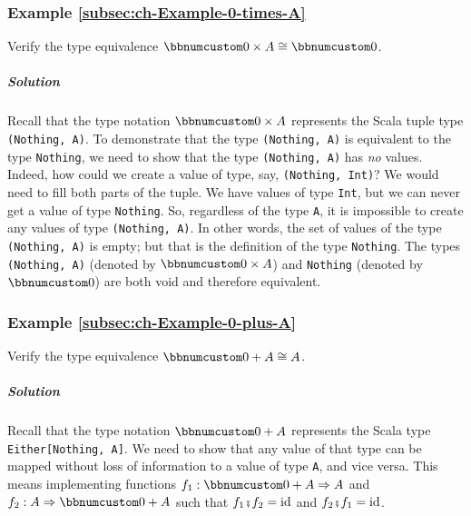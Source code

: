 \subsubsection{Example \label{subsec:ch-Example-0-times-A}\ref{subsec:ch-Example-0-times-A}}

Verify the type equivalence $\bbnum 0\times A\cong\bbnum 0$.

\subparagraph{Solution}

Recall that the type notation $\bbnum 0\times A$ represents the Scala
tuple type \lstinline!(Nothing, A)!. To demonstrate that the type
\lstinline!(Nothing, A)! is equivalent to the type \lstinline!Nothing!,
we need to show that the type \lstinline!(Nothing, A)! has \emph{no}
values. Indeed, how could we create a value of type, say, \lstinline!(Nothing, Int)!?
We would need to fill both parts of the tuple. We have values of type
\lstinline!Int!, but we can never get a value of type \lstinline!Nothing!.
So, regardless of the type \lstinline!A!, it is impossible to create
any values of type \lstinline!(Nothing, A)!. In other words, the
set of values of the type \lstinline!(Nothing, A)! is empty; but
that is the definition of the type \lstinline!Nothing!. The types
\lstinline!(Nothing, A)! (denoted by $\bbnum 0\times A$) and \lstinline!Nothing!
(denoted by $\bbnum 0$) are both void and therefore equivalent.

\subsubsection{Example \label{subsec:ch-Example-0-plus-A}\ref{subsec:ch-Example-0-plus-A}}

Verify the type equivalence $\bbnum 0+A\cong A$.

\subparagraph{Solution}

Recall that the type notation $\bbnum 0+A$ represents the Scala type
\lstinline!Either[Nothing, A]!. We need to show that any value of
that type can be mapped without loss of information to a value of
type \lstinline!A!, and vice versa. This means implementing functions
$f_{1}:\bbnum 0+A\Rightarrow A$ and $f_{2}:A\Rightarrow\bbnum 0+A$
such that $f_{1}\bef f_{2}=\text{id}$ and $f_{2}\bef f_{1}=\text{id}$.

